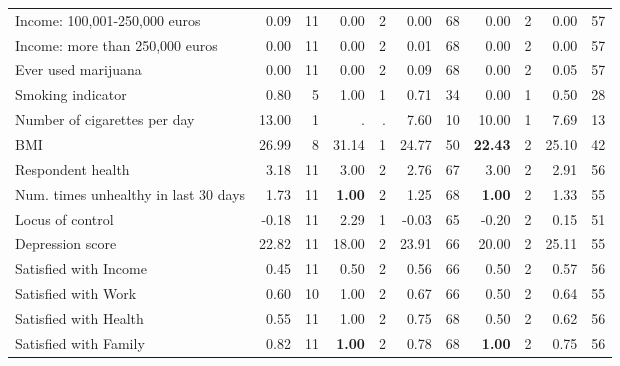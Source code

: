\begin{tabular}{l r r r r r r r r r r}
Income: 100,001-250,000 euros &      0.09 &        11 &      0.00 &         2 &      0.00 &        68 &      0.00 &         2 &      0.00 &        57 \\
Income: more than 250,000 euros &      0.00 &        11 &      0.00 &         2 &      0.01 &        68 &      0.00 &         2 &      0.00 &        57 \\
Ever used marijuana &      0.00 &        11 &      0.00 &         2 &      0.09 &        68 &      0.00 &         2 &      0.05 &        57 \\
Smoking indicator &      0.80 &         5 &      1.00 &         1 &      0.71 &        34 &      0.00 &         1 &      0.50 &        28 \\
Number of cigarettes per day &     13.00 &         1 &         . & . &      7.60 &        10 &     10.00 &         1 &      7.69 &        13 \\
BMI &     26.99 &         8 &     31.14 &         1 &     24.77 &        50 & \textbf{    22.43} &         2 &     25.10 &        42 \\
Respondent health &      3.18 &        11 &      3.00 &         2 &      2.76 &        67 &      3.00 &         2 &      2.91 &        56 \\
Num. times unhealthy in last 30 days &      1.73 &        11 & \textbf{     1.00} &         2 &      1.25 &        68 & \textbf{     1.00} &         2 &      1.33 &        55 \\
Locus of control &     -0.18 &        11 &      2.29 &         1 &     -0.03 &        65 &     -0.20 &         2 &      0.15 &        51 \\
Depression score &     22.82 &        11 &     18.00 &         2 &     23.91 &        66 &     20.00 &         2 &     25.11 &        55 \\
Satisfied with Income &      0.45 &        11 &      0.50 &         2 &      0.56 &        66 &      0.50 &         2 &      0.57 &        56 \\
Satisfied with Work &      0.60 &        10 &      1.00 &         2 &      0.67 &        66 &      0.50 &         2 &      0.64 &        55 \\
Satisfied with Health &      0.55 &        11 &      1.00 &         2 &      0.75 &        68 &      0.50 &         2 &      0.62 &        56 \\
Satisfied with Family &      0.82 &        11 & \textbf{     1.00} &         2 &      0.78 &        68 & \textbf{     1.00} &         2 &      0.75 &        56 \\
\bottomrule
\end{tabular}

